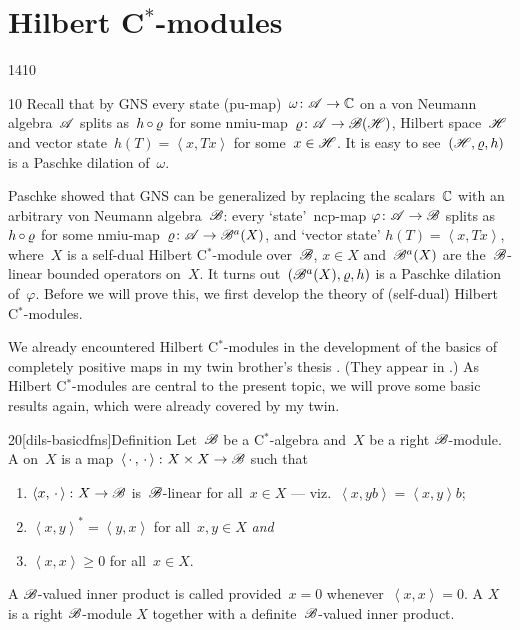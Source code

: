 \section{Hilbert C$^*$-modules}
\begin{parsec}{1410}%
\begin{point}{10}%
Recall that by GNS
    every state (pu-map)~$\omega\colon \mathscr{A} \to \mathbb{C}$
    on a von Neumann algebra~$\mathscr{A}$
    splits as~$h \mathop{\circ} \varrho$
    for some nmiu-map~$\varrho\colon \mathscr{A} \to \mathscr{B}(\mathscr{H})$,
        Hilbert space~$\mathscr{H}$
        and vector state~$h (T) =  \left<x, T x\right>$
         for some~$x \in \mathscr{H}$.
It is easy to see~$(\mathscr{H}, \varrho, h)$ is a Paschke dilation of~$\omega$.


Paschke showed that GNS can be generalized by replacing the scalars~$\mathbb{C}$
    with an arbitrary von Neumann algebra~$\mathscr{B}$:
    every `state'~ncp-map $\varphi\colon \mathscr{A} \to \mathscr{B}$
    splits as~$h \mathop{\circ} \varrho$
    for some nmiu-map~$\varrho\colon \mathscr{A} \to \mathscr{B}^a (X)$,
    and `vector state' $h(T) = \left<x, Tx\right>$,
    where~$X$ is a self-dual Hilbert C$^*$-module over~$\mathscr{B}$, $x \in X$
     and~$\mathscr{B}^a(X)$ are the~$\mathscr{B}$-linear bounded operators on~$X$.
It turns out~$(\mathscr{B}^a(X), \varrho, h)$
    is a Paschke dilation of~$\varphi$.
Before we will prove this,
    we first develop the theory of (self-dual) Hilbert C$^*$-modules.

We already encountered Hilbert C$^*$-modules
    in the development of the basics of completely positive maps
    in my twin brother's thesis \cite{bram}.
(They appear in .)
As Hilbert C$^*$-modules are central to the present topic,
    we will prove some basic results again, which were already
    covered by my twin.
\end{point}
\begin{point}{20}[dils-basicdfns]{Definition}%
    Let~$\mathscr{B}$ be a C$^*$-algebra and~$X$
        be a right $\mathscr{B}$-module.
        A 
            on~$X$
        is a map~$\left<\,\cdot\,,\,\cdot\,\right>\colon X \times X \to \mathscr{B}$
        such that
        \begin{enumerate}
            \item $\left<x, \,\cdot\,\right> \colon X \to  \mathscr{B}$
                    is~$\mathscr{B}$-linear for all~$x \in X$
                    --- viz.~$\left< x, yb\right> = \left<x, y\right>b$;
            \item $\left<x,y\right>^* = \left<y,x\right>$
                for all~$x,y\in X$ \emph{and}
            \item $\left<x,x\right> \geq 0$ for all~$x \in X$.
        \end{enumerate}
        A $\mathscr{B}$-valued inner product is called 
        provided~$x = 0$ whenever~$\left<x,x\right>=0$.
        A  $X$
        is a right $\mathscr{B}$-module $X$
        together with a definite~$\mathscr{B}$-valued inner product.


\end{point}
\end{parsec}
